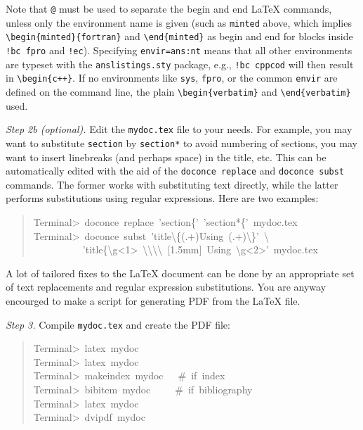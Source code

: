 \documentclass[a4paper]{article}
\begin{document}
Note that \texttt{@} must be used to separate the begin and end LaTeX
commands, unless only the environment name is given (such as \texttt{minted}
above, which implies \texttt{\textbackslash{}begin\{minted\}\{fortran\}} and \texttt{\textbackslash{}end\{minted\}} as
begin and end for blocks inside \texttt{!bc fpro} and \texttt{!ec}).  Specifying
\texttt{envir=ans:nt} means that all other environments are typeset with the
\texttt{anslistings.sty} package, e.g., \texttt{!bc cppcod} will then result in
\texttt{\textbackslash{}begin\{c++\}}. If no environments like \texttt{sys}, \texttt{fpro}, or the common
\texttt{envir} are defined on the command line, the plain \texttt{\textbackslash{}begin\{verbatim\}}
and \texttt{\textbackslash{}end\{verbatim\}} used.

\emph{Step 2b (optional).} Edit the \texttt{mydoc.tex} file to your needs.
For example, you may want to substitute \texttt{section} by \texttt{section*} to
avoid numbering of sections, you may want to insert linebreaks
(and perhaps space) in the title, etc. This can be automatically
edited with the aid of the \texttt{doconce replace} and \texttt{doconce subst}
commands. The former works with substituting text directly, while the
latter performs substitutions using regular expressions.
Here are two examples:
%
\begin{quote}{\ttfamily \raggedright \noindent
Terminal>~doconce~replace~'section\{'~'section*\{'~mydoc.tex\\
Terminal>~doconce~subst~'title\textbackslash{}\{(.+)Using~(.+)\textbackslash{}\}'~\textbackslash{}\\
~~~~~~~~~~'title\{\textbackslash{}g<1>~\textbackslash{}\textbackslash{}\textbackslash{}\textbackslash{}~{[}1.5mm{]}~Using~\textbackslash{}g<2>'~mydoc.tex
}
\end{quote}

A lot of tailored fixes to the LaTeX document can be done by
an appropriate set of text replacements and regular expression
substitutions. You are anyway encourged to make a script for
generating PDF from the LaTeX file.

\emph{Step 3.} Compile \texttt{mydoc.tex}
and create the PDF file:
%
\begin{quote}{\ttfamily \raggedright \noindent
Terminal>~latex~mydoc\\
Terminal>~latex~mydoc\\
Terminal>~makeindex~mydoc~~~\#~if~index\\
Terminal>~bibitem~mydoc~~~~~\#~if~bibliography\\
Terminal>~latex~mydoc\\
Terminal>~dvipdf~mydoc
}
\end{quote}
\end{document}
